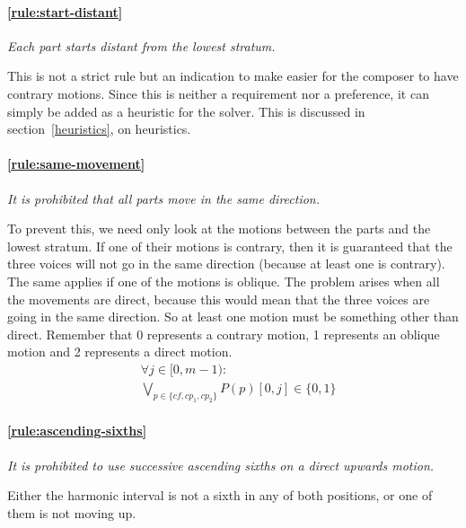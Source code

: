     \paragraph{\hspace{.6cm}\ref{rule:start-distant}}   \textit{Each part starts distant from the lowest stratum.}

    This is not a strict rule but an indication to make easier for the composer to have contrary motions. Since this is neither a requirement nor a preference, it can simply be added as a heuristic for the solver. This is discussed in section~\ref{heuristics}, on heuristics.


    \paragraph{\hspace{.6cm}\ref{rule:same-movement}}  \textit{It is prohibited that all parts move in the same direction.}

    To prevent this, we need only look at the motions between the parts and the lowest stratum. If one of their motions is contrary, then it is guaranteed that the three voices will not go in the same direction (because at least one is contrary). The same applies if one of the motions is oblique. The problem arises when all the movements are direct, because this would mean that the three voices are going in the same direction. So at least one motion must be something other than direct. Remember that 0 represents a contrary motion, 1 represents an oblique motion and 2 represents a direct motion.
    \begin{equation} \begin{aligned}
    &\forall j \in [0, m-1) \colon\\
    &\bigvee_{p \in \{\mathit{cf}, cp_1, cp_2\}}  P(p)[0, j] \in \{0, 1\}
    \end{aligned} \end{equation}
    

    \paragraph{\hspace{.6cm}\ref{rule:ascending-sixths}}  \textit{It is prohibited to use successive ascending sixths on a direct upwards motion.}

    Either the harmonic interval is not a sixth in any of both positions, or one of them is not moving up.

